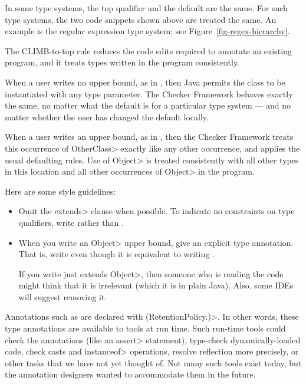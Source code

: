 In some type systems, the top qualifier and the default are the same.  For
such type systems, the two code snippets shown above are treated the same.
An example is the regular expression type system; see
Figure~\ref{fig-regex-hierarchy}.

The CLIMB-to-top rule reduces the code edits required to annotate an
existing program, and it treats types written in the program consistently.

When a user writes no upper bound, as in
,
then Java permits the class to be instantiated with any type parameter.
The Checker Framework behaves exactly the same, no matter what the default
is for a particular type system --- and no matter whether the user has
changed the default locally.

When a user writes an upper bound, as in
,
then the Checker Framework treats this occurrence of \<OtherClass> exactly
like any other occurrence, and applies the usual defaulting rules.  Use of
\<Object> is treated consistently with all other types in this location and
all other occurrences of \<Object> in the program.

Here are some style guidelines:
\begin{itemize}
\item
  Omit the \<extends> clause when possible.  To indicate no constraints on
  type qualifiers, write  rather than .
\item
  When you write an \<Object> upper bound, give an explicit type annotation.
  That is, write  even though it is equivalent to writing
  .

  If you write just \<extends Object>, then someone who is reading the code
  might think that it is irrelevant (which it is in plain Java).  Also,
  some IDEs will suggest removing it.
\end{itemize}



Annotations such as  are
declared with
\<(RetentionPolicy.)>.  In other words,
these type annotations are available to tools at run time.  Such run-time
tools could check the annotations (like an \<assert> statement), type-check
dynamically-loaded code, check casts and \<instanceof> operations, resolve
reflection more precisely, or other tasks that we have not yet thought of.
Not many such tools exist today, but the annotation designers wanted to
accommodate them in the future.

